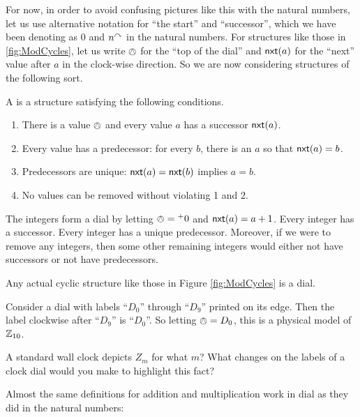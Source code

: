 For now, in order to avoid confusing pictures like this with the natural numbers, let us use alternative notation for ``the start'' and ``successor'', which we have been denoting as $0$ and $n^\curvearrowright$ in the natural numbers.
For structures like those in \ref{fig:ModCycles}, let us write $\owedge$ for the ``top of the dial'' and $\mathord{\textsf{nxt}}(a)$ for the ``next'' value after $a$ in the clock-wise direction. So we are now considering structures of the following sort.

\begin{defn}
	A  is a structure satisfying the following conditions.
\begin{enumerate}
	\item There is a value $\owedge$ and every value $a$ has a successor $\mathord{\textsf{nxt}}(a)$.
	\item Every value has a predecessor: for every $b$, there is an $a$ so that $\mathord{\textsf{nxt}}(a) = b$.
	\item Predecessors are unique: $\mathord{\textsf{nxt}}(a) = \mathord{\textsf{nxt}}(b)$ implies $a=b$.
	\item No values can be removed without violating 1 and 2.
\end{enumerate}
\end{defn}

\begin{example}
The integers form a dial by letting $\owedge={}^+0$ and $\mathord{\textsf{nxt}}(a)=a+1$.
Every integer has a successor. Every integer has a unique predecessor. Moreover, if we were to remove any integers, then some other remaining integers would either not have successors or not have predecessors.

Any actual cyclic structure like those in Figure \ref{fig:ModCycles} is a dial.

Consider a dial with labels ``$D_0$'' through ``$D_9$'' printed on its edge. Then the label clockwise after ``$D_9$'' is ``$D_0$''. So letting $\owedge = D_0$, this is a physical model of ${\mathbb Z}_{10}$.
\end{example}

\begin{exer}
	\begin{exercise}
		\item A standard wall clock depicts $Z_m$ for what $m$? What changes on the labels of a clock dial would you make to highlight this fact?
	\end{exercise}
\end{exer}   

Almost the same definitions for addition and multiplication work in dial as they did in the natural numbers:

